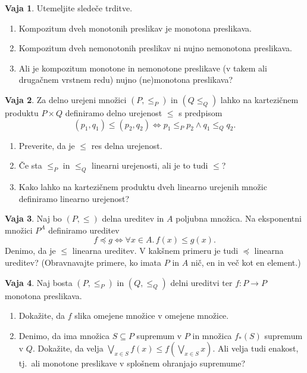 \documentclass{article}
\newcommand{\all}[1]{\forall #1 .\,}
\theoremstyle{definition}
\newtheorem{vaja}{Vaja}
\begin{document}
\begin{vaja}
  Utemeljite sledeče trditve.
  \begin{enumerate}
    \item
      Kompozitum dveh monotonih preslikav je monotona preslikava.
    \item
      Kompozitum dveh nemonotonih preslikav ni nujno nemonotona preslikava.
    \item
      Ali je kompozitum monotone in nemonotone preslikave (v takem ali drugačnem vrstnem redu) nujno (ne)monotona preslikava?
  \end{enumerate}
\end{vaja}

\begin{vaja}
  Za delno urejeni množici $(P, \leq_P)$ in $(Q \leq_Q)$ lahko na kartezičnem produktu $P \times Q$ definiramo delno urejenost $\leq$ s predpisom
  \[(p_1, q_1) \leq (p_2, q_2) \iff p_1 \leq_P p_2 \land q_1 \leq_Q q_2.\]
  \begin{enumerate}
    \item
      Preverite, da je $\leq$ res delna urejenost.
    \item
      Če sta $\leq_P$ in $\leq_Q$ linearni urejenosti, ali je to tudi $\leq$?
    \item
      Kako lahko na kartezičnem produktu dveh linearno urejenih množic definiramo linearno urejenost?
  \end{enumerate}
\end{vaja}

\begin{vaja}
  Naj bo $(P, \leq)$ delna ureditev in $A$ poljubna množica. Na eksponentni množici $P^A$ definiramo ureditev
  \begin{equation*}
    f \preceq g \iff \all{x \in A}{f(x) \leq g(x)}.
  \end{equation*}
  Denimo, da je $\leq$ linearna ureditev. V kakšnem primeru je tudi $\preceq$ linearna ureditev? (Obravnavajte primere, ko imata $P$ in $A$ nič, en in več kot en element.)  
\end{vaja}

\begin{vaja}
  Naj bosta $(P, \leq_P)$ in $(Q, \leq_Q)$ delni ureditvi ter $f\colon P \to P$ monotona preslikava.
  \begin{enumerate}
    \item
      Dokažite, da $f$ slika omejene množice v omejene množice.
    \item
      Denimo, da ima množica $S \subseteq P$ supremum v $P$ in množica $f_*(S)$ supremum v $Q$. Dokažite, da velja $\bigvee_{x \in S} f(x) \leq f(\bigvee_{x \in S} x)$. Ali velja tudi enakost, tj.~ali monotone preslikave v splošnem ohranjajo supremume?
  \end{enumerate}
\end{vaja}
\end{document}
